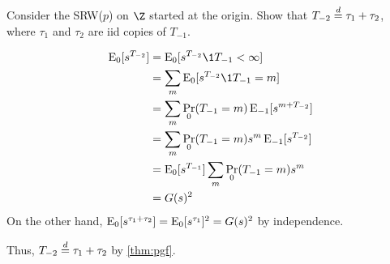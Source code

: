 \begin{exercise}
    Consider the SRW($p$) on $\Z$ started at the origin.
    Show that $T_{-2} \overset{d}{=} \tau_1 + \tau_2$, where $\tau_1$ and $\tau_2$ are
    iid copies of $T_{-1}$.
\end{exercise}
\begin{solution}
    \begin{align*}
        \E_0[s^{T_{-2}}] &= \E_0[s^{T_{-2}} \1{T_{-1} < \infty}] \\
            &= \sum_m \E_0[s^{T_{-2}} \1{T_{-1} = m}] \\
            &= \sum_m \Pr_0(T_{-1} = m) \E_{-1}[s^{m + T_{-2}}] \\
            &= \sum_m \Pr_0(T_{-1} = m) s^m \E_{-1}[s^{T_{-2}}] \\
            &= \E_0[s^{T_{-1}}] \sum_m \Pr_0(T_{-1} = m) s^m \\
            &= G(s)^2
    \end{align*}
    On the other hand, $\operatorname{\mathrm{E}}_0[s^{\tau_1 + \tau_2}] = \operatorname{\mathrm{E}}_0[s^{\tau_1}]^2
    = G(s)^2$ by independence.

    Thus, $T_{-2} \overset{d}{=} \tau_1 + \tau_2$ by \cref{thm:pgf}.
\end{solution}


